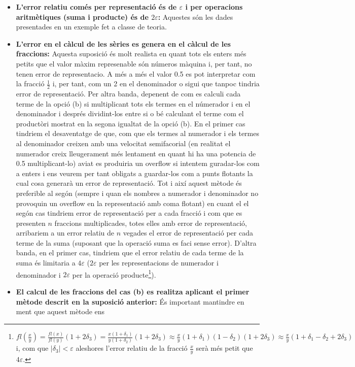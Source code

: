 \documentclass[a4paper,10pt]{article}
\renewcommand{\*}{\cdot}
\renewcommand{\epsilon}{\varepsilon}
\renewcommand{\lambda}{\delta}
\begin{document}
\begin{itemize}
 \item \textbf{L'error relatiu comés per representació és de $\epsilon$  i per operacions aritmètiques (suma i producte) és de $2\epsilon$:} Aquestes són les dades
 presentades en un exemple fet a classe de teoria.
 \item \textbf{L'error en el càlcul de les sèries es genera en el càlcul de les fraccions:} Aquesta suposició és molt realista en quant tots els enters més petits que el
 valor màxim represenable són números màquina i, per tant, no tenen error de representacio. A més a més el valor 0.5 es pot interpretar com la fracció $\frac{1}{2}$ i,
 per tant, com un 2 en el denominador o sigui que tanpoc tindria error de representació. Per altra banda, depenent de com es calculi cada terme de la opció (b) si 
 multiplicant tots els termes en el númerador i en el denominador i després dividint-los entre si o bé calculant el terme com el productòri mostrat en la segona igualtat
 de la opció (b). En el primer cas tindriem el desaventatge de que, com que els termes al numerador i els termes al denominador creixen amb una velocitat semifacorial
 (en realitat el numerador creix lleugerament més lentament en quant hi ha una potencia de 0.5 multiplicant-lo)
 aviat es produiria un overflow si intentem guradar-los com a enters i ens veurem per tant obligats a guardar-los com a punts flotants la cual 
 cosa generarà un error de representació. Tot i així aquest mètode és preferible al segón (sempre i quan els nombres a numerador i denominador no provoquin un overflow en la
 representació amb coma flotant) en cuant el el segón cas tindriem error de representació per a cada fracció i com que es presenten $n$ fraccions multiplicades, totes 
 elles amb error de representació, arribariem a un error relatiu de $n$ vegades el error de representació per cada terme de la suma (suposant que la operació suma es faci
 sense error). D'altra banda, en el primer cas, tindriem que el error relatiu de cada terme de la suma és limitaria a $4\epsilon$ ($2\epsilon$ per les representacions
 de numerador i denominador i $2\epsilon$ per la operació producte\footnote{$fl\left(\frac{x}{y}\right)=\frac{fl(x)}{fl(y)}(1+2\lambda_3)=
 \frac{x(1+\lambda_1)}{y(1+\lambda_2)}(1+2\lambda_3)\approx\frac{x}{y}(1+\lambda_1)(1-\lambda_2)(1+2\lambda_3)\approx\frac{x}{y}(1+\lambda_1-\lambda_2+2\lambda_3)$ i, com 
 que $|\lambda_3|<\epsilon$ aleshores l'error relatiu de la fracció $\frac{x}{y}$ serà més petit que $4\epsilon$.}).
 \item \textbf{El calcul de les fraccions del cas (b) es realitza aplicant el primer mètode descrit en la suposició anterior:} És important mantindre en ment que aquest mètode ens 

\end{itemize}
\end{document}
